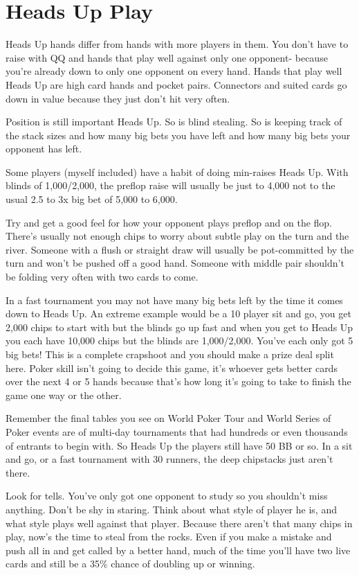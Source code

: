 \section{Heads Up Play}

Heads Up hands differ from hands with more players in them.
You don't have to raise with QQ and hands that play well
against only one opponent- because you're already down
to only one opponent on every hand. Hands that play
well Heads Up are high card hands and pocket pairs.
Connectors and suited cards go down in value because
they just don't hit very often.

Position is still important Heads Up. So is blind stealing.
So is keeping track of the stack sizes and how many big bets
you have left and how many big bets your opponent has left.

Some players (myself included) have a habit of doing min-raises
Heads Up. With blinds of 1,000/2,000, the preflop raise will usually
be just to 4,000 not to the usual 2.5 to 3x big bet of 5,000 to 6,000.

Try and get a good feel for how your opponent plays
preflop and on the flop. There's usually not enough
chips to worry about subtle play on the turn and the river.
Someone with a flush or straight draw will usually be
pot-committed by the turn and won't be pushed off a
good hand. Someone with middle pair shouldn't be folding
very often with two cards to come.

In a fast tournament you may not have many big bets left by
the time it comes down to Heads Up. An extreme example would
be a 10 player sit and go, you get 2,000 chips to start with
but the blinds go up fast and when you get to Heads Up
you each have 10,000 chips but the blinds are 1,000/2,000.
You've each only got 5 big bets! This is a complete
crapshoot and you should make a prize deal split here. Poker skill
isn't going to decide this game, it's whoever gets better
cards over the next 4 or 5 hands because that's how long
it's going to take to finish the game one way or the other.


Remember the final tables you see on World Poker Tour and
World Series of Poker events are of multi-day tournaments that had
hundreds or even thousands of entrants to begin with. So Heads Up the
players still have 50 BB or so. In a sit and go, or
a fast tournament with 30 runners, the deep chipstacks
just aren't there.

Look for tells. You've only got one opponent to study so
you shouldn't miss anything. Don't be shy in staring.
Think about what style of player he is, and what style
plays well against that player. Because there aren't
that many chips in play, now's the time to steal from
the rocks. Even if you make a mistake and push all in
and get called by a better hand, much of the time you'll
have two live cards and still be a 35\% chance of doubling
up or winning.

